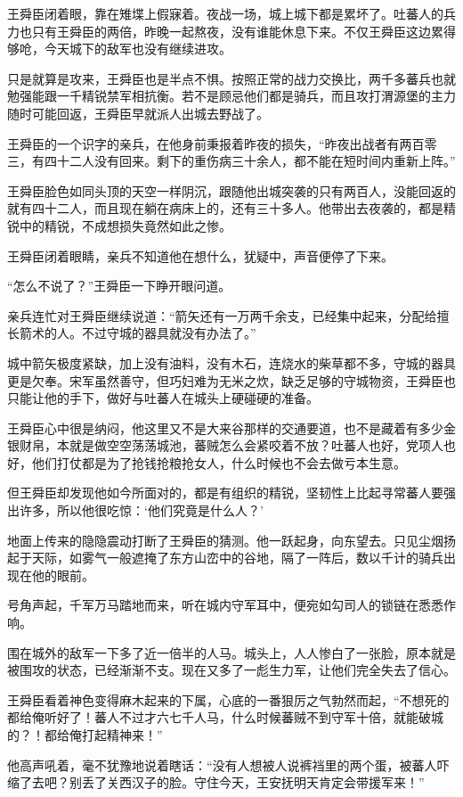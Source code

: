 王舜臣闭着眼，靠在雉堞上假寐着。夜战一场，城上城下都是累坏了。吐蕃人的兵力也只有王舜臣的两倍，昨晚一起熬夜，没有谁能休息下来。不仅王舜臣这边累得够呛，今天城下的敌军也没有继续进攻。

只是就算是攻来，王舜臣也是半点不惧。按照正常的战力交换比，两千多蕃兵也就勉强能跟一千精锐禁军相抗衡。若不是顾忌他们都是骑兵，而且攻打渭源堡的主力随时可能回返，王舜臣早就派人出城去野战了。

王舜臣的一个识字的亲兵，在他身前秉报着昨夜的损失，“昨夜出战者有两百零三，有四十二人没有回来。剩下的重伤病三十余人，都不能在短时间内重新上阵。”

王舜臣脸色如同头顶的天空一样阴沉，跟随他出城突袭的只有两百人，没能回返的就有四十二人，而且现在躺在病床上的，还有三十多人。他带出去夜袭的，都是精锐中的精锐，不成想损失竟然如此之惨。

王舜臣闭着眼睛，亲兵不知道他在想什么，犹疑中，声音便停了下来。

“怎么不说了？”王舜臣一下睁开眼问道。

亲兵连忙对王舜臣继续说道：“箭矢还有一万两千余支，已经集中起来，分配给擅长箭术的人。不过守城的器具就没有办法了。”

城中箭矢极度紧缺，加上没有油料，没有木石，连烧水的柴草都不多，守城的器具更是欠奉。宋军虽然善守，但巧妇难为无米之炊，缺乏足够的守城物资，王舜臣也只能让他的手下，做好与吐蕃人在城头上硬碰硬的准备。

王舜臣心中很是纳闷，他这里又不是大来谷那样的交通要道，也不是藏着有多少金银财帛，本就是做空空荡荡城池，蕃贼怎么会紧咬着不放？吐蕃人也好，党项人也好，他们打仗都是为了抢钱抢粮抢女人，什么时候也不会去做亏本生意。

但王舜臣却发现他如今所面对的，都是有组织的精锐，坚韧性上比起寻常蕃人要强出许多，所以他很吃惊：‘他们究竟是什么人？’

地面上传来的隐隐震动打断了王舜臣的猜测。他一跃起身，向东望去。只见尘烟扬起于天际，如雾气一般遮掩了东方山峦中的谷地，隔了一阵后，数以千计的骑兵出现在他的眼前。

号角声起，千军万马踏地而来，听在城内守军耳中，便宛如勾司人的锁链在悉悉作响。

围在城外的敌军一下多了近一倍半的人马。城头上，人人惨白了一张脸，原本就是被围攻的状态，已经渐渐不支。现在又多了一彪生力军，让他们完全失去了信心。

王舜臣看着神色变得麻木起来的下属，心底的一番狠厉之气勃然而起，“不想死的都给俺听好了！蕃人不过才六七千人马，什么时候蕃贼不到守军十倍，就能破城的？！都给俺打起精神来！”

他高声吼着，毫不犹豫地说着瞎话：“没有人想被人说裤裆里的两个蛋，被蕃人吓缩了去吧？别丢了关西汉子的脸。守住今天，王安抚明天肯定会带援军来！”

